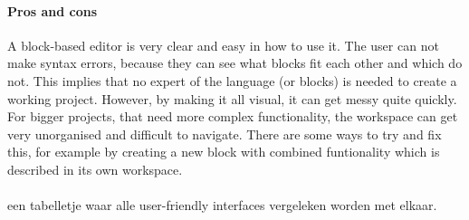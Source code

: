 \documentclass[11pt,a4paper]{report}
\begin{document}
\paragraph{Pros and cons}
A block-based editor is very clear and easy in how to use it. The user can not make syntax errors, because they can see what blocks fit each other and which do not. This implies that no expert of the language (or blocks) is needed to create a working project. However, by making it all visual, it can get messy quite quickly. For bigger projects, that need more complex functionality, the workspace can get very unorganised and difficult to navigate. There are some ways to try and fix this, for example by creating a new block with combined funtionality which is described in its own workspace. 
\\\\
een tabelletje waar alle user-friendly interfaces vergeleken worden met elkaar.
\\\\
\printbibliography
\end{document}
